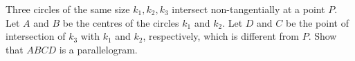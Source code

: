 Three circles of the same size $k_1,k_2,k_3$ intersect non-tangentially at a point $P$.
Let $A$ and $B$ be the centres of the circles $k_1$ and $k_2$.
Let $D$ and $C$ be the point of intersection of $k_3$ with $k_1$ and $k_2$,
respectively, which is different from $P$. Show that $ABCD$ is a parallelogram.